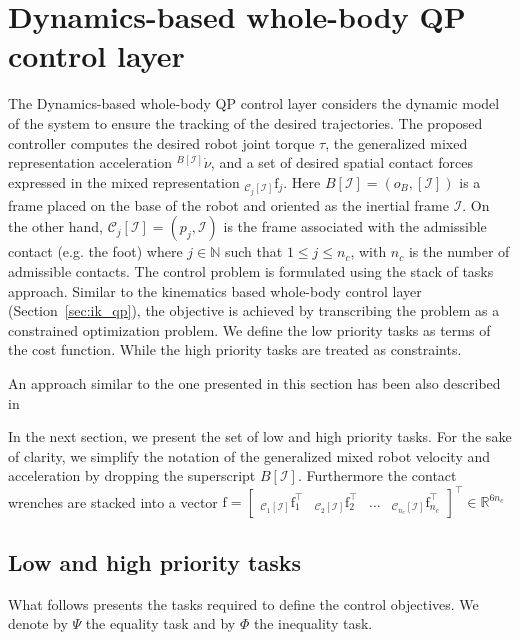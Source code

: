 \section{Dynamics-based whole-body QP control layer} \label{sec:dynamics_QP}
The Dynamics-based whole-body QP control layer considers the dynamic model of the system to ensure the tracking of the desired trajectories. The proposed controller computes the desired robot joint torque $\tau$, the generalized mixed representation acceleration ${}^{B[\mathcal{I}]}\dot{\nu}$, and a set of desired spatial contact forces expressed in the mixed representation ${}_{\mathcal{C}_j[\mathcal{I}]}\mathrm{f}_j$. Here $B[\mathcal{I}] = (o_B, [\mathcal{I}])$ is a frame placed on the base of the robot and oriented as the inertial frame $\mathcal{I}$. On the other hand, $\mathcal{C}_j[\mathcal{I}] = (p_j, \mathcal{I})$ is the frame associated with the admissible contact (e.g. the foot) where $j\in\mathbb{N}$ such that $1\le j \le n_c$, with $n_c$ is the number of admissible contacts. The control problem is formulated using the stack of tasks approach. Similar to the kinematics based whole-body control layer (Section~\ref{sec:ik_qp}), the objective is achieved by transcribing the problem as a constrained optimization problem. We define the low priority tasks as terms of the cost function. While the high priority tasks are treated as constraints.
\par
An approach similar to the one presented in this section has been also described in~\citep{nava16,Dean-Leon2019Whole-BodySkin,Englsberger2018,DelPrete2016ImplementingSensors,Henze2016,Ramuzat2022PassiveMulti-Contact,Mesesan2019}
\par
In the next section, we present the set of low and high priority tasks. For the sake of clarity, we simplify the notation of the generalized mixed robot velocity and acceleration by dropping the superscript $B[\mathcal{I}]$. Furthermore the contact wrenches are stacked into a vector $\mathrm{f} = \begin{bmatrix}
{}_{\mathcal{C}_1[\mathcal{I}]}\mathrm{f}_1^\top & {}_{\mathcal{C}_2[\mathcal{I}]}\mathrm{f}_2^\top & \hdots & {}_{\mathcal{C}_{n_c}[\mathcal{I}]}\mathrm{f}_{n_c}^\top 
\end{bmatrix}^\top \in \mathbb{R}^{6 n_c }$

\subsection{Low and high priority tasks\label{sec:tsid_tasks}}
What follows presents the tasks required to define the control objectives. We denote by $\Psi$ the equality task and by $\Phi$ the inequality task.

